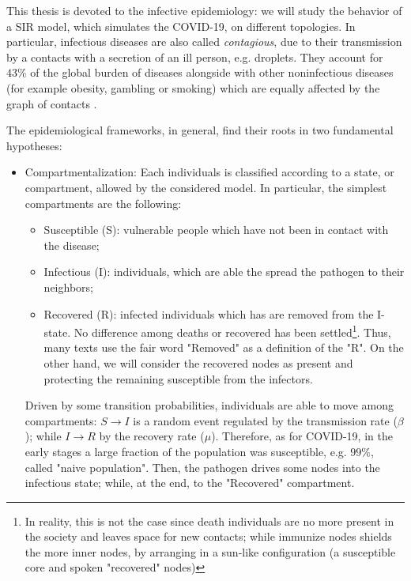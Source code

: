 \documentclass[a4paper,10pt, oneside]{book} %
\theoremstyle{definition}
\begin{document}
This thesis is devoted to the infective epidemiology: we will study the behavior of a SIR model, which simulates the COVID-19, on different topologies. In particular, infectious diseases are also called \textit{contagious}, due to their transmission by a contacts with a secretion of an ill person, e.g. droplets. They account for $43\%$ of the global burden of diseases alongside with other noninfectious diseases (for example obesity, gambling or smoking) which are equally affected by the graph of contacts \cite{barabasi::2016networkbook}.

The epidemiological frameworks, in general, find their roots in two fundamental hypotheses:
\begin{itemize}
	\item Compartmentalization: Each individuals is classified according to a state, or compartment, allowed by the considered model. In particular, the simplest compartments are the following:
	\begin{itemize}
		\item Susceptible (S): vulnerable people which have not been in contact with the disease;
		\item Infectious (I): individuals, which are able the spread the pathogen to their neighbors;
		\item Recovered (R): infected individuals which has are removed from the I-state. No difference among deaths or recovered has been settled\footnote{In reality, this is not the case since death individuals are no more present in the society and leaves space for new contacts; while immunize nodes shields the more inner nodes, by arranging in a sun-like configuration (a susceptible core and spoken "recovered" nodes)}. Thus, many texts use the fair word "Removed" as a definition of the "R". On the other hand, we will consider the recovered nodes as present and protecting the remaining susceptible from the infectors.
	\end{itemize}
	
	Driven by some transition probabilities, individuals are able to move among compartments: $S \rightarrow I$ is a random event regulated by the transmission rate ($\beta$); while $I \rightarrow R$ by the recovery rate ($\mu$). Therefore, as for COVID-19, in the early stages a large fraction of the population was susceptible, e.g. $99\%$, called "naive population". Then, the pathogen drives some nodes into the infectious state; while, at the end, to the "Recovered" compartment.


\end{itemize}
\end{document}

